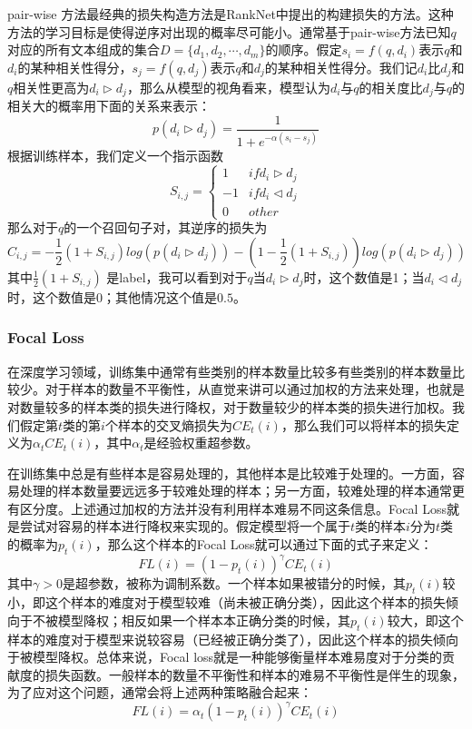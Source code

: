 \documentclass[twoside,a4paper,12pt]{book}%
\begin{document}
pair-wise 方法最经典的损失构造方法是RankNet中提出的构建损失的方法。这种方法的学习目标是使得逆序对出现的概率尽可能小。通常基于pair-wise方法已知$q$对应的所有文本组成的集合$D=\{d_1,d_2,\cdots,d_m\}$的顺序。假定$s_i=f(q,d_i)$表示$q$和$d_i$的某种相关性得分，$s_j=f(q,d_j)$表示$q$和$d_j$的某种相关性得分。我们记$d_i$比$d_j$和$q$相关性更高为$d_i\triangleright d_j$，那么从模型的视角看来，模型认为$d_i$与$q$的相关度比$d_j$与$q$的相关大的概率用下面的关系来表示：
$$
p(d_i\triangleright d_j)=\frac{1}{1+e^{-\alpha(s_i-s_j)}}
$$
根据训练样本，我们定义一个指示函数
$$
S_{i,j}=
    \begin{cases}
        1   & if d_i \triangleright d_j\\
        -1  & if d_i \triangleleft d_j\\
        0   & other
    \end{cases}  
$$
那么对于$q$的一个召回句子对，其逆序的损失为
$$
C_{i,j}=-\frac{1}{2}(1+S_{i,j})log(p(d_i\triangleright d_j))-
(1-\frac{1}{2}(1+S_{i,j}))log(p(d_i\triangleright d_j))
$$
其中$\frac{1}{2}(1+S_{i,j})$ 是label，我可以看到对于$q$当$d_i \triangleright d_j$时，这个数值是1；当$d_i \triangleleft d_j$时，这个数值是0；其他情况这个值是$0.5$。

\subsubsection{Focal Loss}
在深度学习领域，训练集中通常有些类别的样本数量比较多有些类别的样本数量比较少。对于样本的数量不平衡性，从直觉来讲可以通过加权的方法来处理，也就是对数量较多的样本类的损失进行降权，对于数量较少的样本类的损失进行加权。我们假定第$t$类的第$i$个样本的交叉熵损失为$CE_t(i)$，那么我们可以将样本的损失定义为$\alpha_{t}CE_t(i)$，其中$\alpha_{t}$是经验权重超参数。

在训练集中总是有些样本是容易处理的，其他样本是比较难于处理的。一方面，容易处理的样本数量要远远多于较难处理的样本；另一方面，较难处理的样本通常更有区分度。上述通过加权的方法并没有利用样本难易不同这条信息。Focal Loss就是尝试对容易的样本进行降权来实现的。假定模型将一个属于$t$类的样本$i$分为$t$类的概率为$p_t(i)$，那么这个样本的Focal Loss就可以通过下面的式子来定义：
$$
FL(i)=(1-p_t(i))^{\gamma}CE_t(i)
$$
其中$\gamma>0$是超参数，被称为调制系数。一个样本如果被错分的时候，其$p_t(i)$较小，即这个样本的难度对于模型较难（尚未被正确分类），因此这个样本的损失倾向于不被模型降权；相反如果一个样本本正确分类的时候，其$p_t(i)$较大，即这个样本的难度对于模型来说较容易（已经被正确分类了），因此这个样本的损失倾向于被模型降权。总体来说，Focal loss就是一种能够衡量样本难易度对于分类的贡献度的损失函数。一般样本的数量不平衡性和样本的难易不平衡性是伴生的现象，为了应对这个问题，通常会将上述两种策略融合起来：
$$
FL(i)=\alpha_{t}(1-p_t(i))^{\gamma}CE_t(i)
$$
\end{document}
